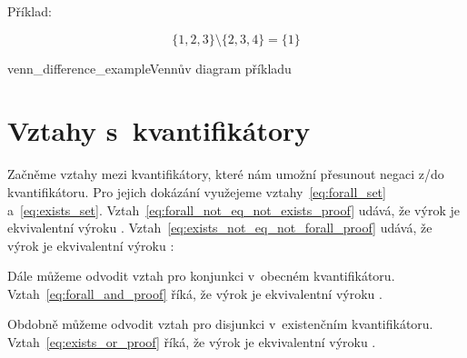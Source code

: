 Příklad:

\begin{equation}
\{1, 2, 3\} \setminus \{2, 3, 4\} = \{1\}
\end{equation}

\begin{fig}{venn_difference_example}{Vennův diagram příkladu}
\end{fig}

\section{Vztahy s~kvantifikátory}

Začněme vztahy mezi kvantifikátory, které nám umožní přesunout negaci z/do kvantifikátoru. Pro jejich dokázání využejeme
vztahy~\eqref{eq:forall_set} a~\eqref{eq:exists_set}. Vztah~\eqref{eq:forall_not_eq_not_exists_proof} udává, že výrok  je ekvivalentní výroku . Vztah~\eqref{eq:exists_not_eq_not_forall_proof} udává, že výrok  je ekvivalentní výroku :


Dále můžeme odvodit vztah pro konjunkci v~obecném kvantifikátoru. Vztah~\eqref{eq:forall_and_proof} říká, že výrok  je ekvivalentní výroku .


Obdobně můžeme odvodit vztah pro disjunkci v~existenčním kvantifikátoru. Vztah~\eqref{eq:exists_or_proof} říká, že výrok  je ekvivalentní výroku .


\begin{fact}
\end{fact}
